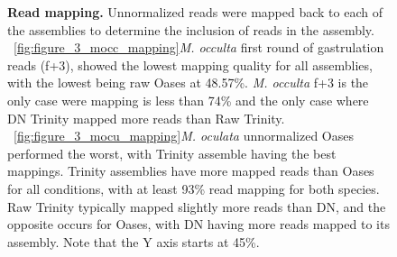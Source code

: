 \begin{figure}[tbp]
	\begin{center}
	\end{center}
	\caption{\textbf{Read mapping.} Unnormalized reads were mapped back to each of the assemblies to determine the inclusion of reads in the assembly. ~\ref{fig:figure_3_mocc_mapping}\textit{M. occulta} first round of gastrulation reads (f+3), showed the lowest mapping quality for all assemblies, with the lowest being raw Oases at 48.57\%. \textit{M. occulta} f+3 is the only case were mapping is less than 74\% and the only case where DN Trinity mapped more reads than Raw Trinity. ~\ref{fig:figure_3_mocu_mapping}\textit{M. oculata} unnormalized Oases performed the worst, with Trinity assemble having the best mappings. Trinity assemblies have more mapped reads than Oases for all conditions, with at least 93\% read mapping for both species. Raw Trinity typically mapped slightly more reads than DN, and the opposite occurs for Oases, with DN having more reads mapped to its assembly.  Note that the Y axis starts at 45\%.}
	\label{fig:read_mapping}
\end{figure}

